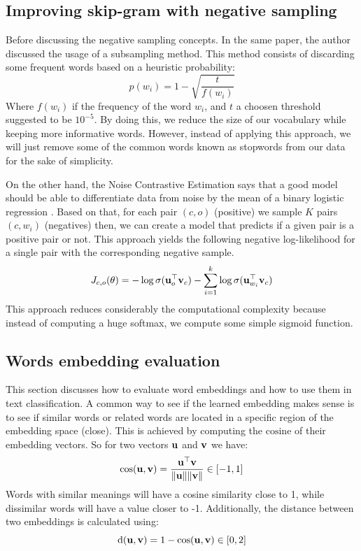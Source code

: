    \subsection{Improving skip-gram with negative sampling}
   Before discussing the negative sampling concepts. In the same paper, the author discussed the usage of a subsampling method. This method consists of discarding some frequent words based on a heuristic probability:
   \begin{equation}
	p(w_i) = 1-\sqrt{\frac{t}{f(w_i)}}
   \end{equation}
   Where $f(w_i)$ if the frequency of the word $w_i$, and $t$ a choosen threshold suggested to be $10^{-5}$. By doing this, we reduce the size of our vocabulary while keeping more informative words. However, instead of applying this approach, we will just remove some of the common words known as stopwords from our data for the sake of simplicity.


   On the other hand, the Noise Contrastive Estimation says that a good model should be able to differentiate data from noise by the mean of a binary logistic regression \cite{sgns}. Based on that, for each pair $(c, o)$ (positive) we sample $K$ pairs $(c, w_i)$ (negatives) then, we can create a model that predicts if a given pair is a positive pair or not. This approach yields the following negative log-likelihood for a single pair with the corresponding negative sample.
   \begin{equation}
   J_{c,o}(\mathbf{\theta}) = -\log\sigma(\mathbf{u}_o^\top\mathbf{v}_c) - \sum_{i=1}^{k}\log\sigma(\mathbf{u}_{w_i}^\top\mathbf{v}_c)
   \end{equation}
   This approach reduces considerably the computational complexity because instead of computing a huge softmax, we compute some simple sigmoid function.


   \subsection{Words embedding evaluation}
   This section discusses how to evaluate word embeddings and how to use them in text classification. A common way to see if the learned embedding makes sense is to see if similar words or related words are located in a specific region of the embedding space (close). This is achieved by computing the $\mathrm{cosine}$ of their embedding vectors. So for two vectors $\mathbf{u}$ and $\mathbf{v}$ we have:
   \begin{equation}
	\cos(\mathbf{u}, \mathbf{v}) =\frac{\mathbf{u}^\top \mathbf{v}}{\|\mathbf{u}\|\|\mathbf{v}\|}\in [-1,1]
   \end{equation}
   Words with similar meanings will have a cosine similarity close to 1, while dissimilar words will have a value closer to -1. Additionally, the distance between two embeddings is calculated using:
   \begin{equation}
	\mathrm{d}(\mathbf{u}, \mathbf{v}) = 1 -\cos(\mathbf{u}, \mathbf{v})\in [0,2]
   \end{equation}


